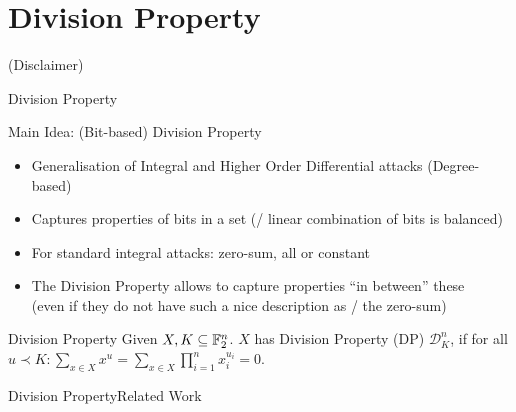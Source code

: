 \section{Division Property}
\begin{frame}[plain]
    \sectionpage
    \centering
    {\large
        (Disclaimer)
    }
    \vfill
\end{frame}

\begin{frame}{Division Property}
    \begin{block}{Main Idea: (Bit-based) Division Property}
        \begin{itemize}
            \item Generalisation of Integral and Higher Order Differential attacks \hfill (Degree-based)
            \item Captures properties of bits in a set \hfill (\eg/ linear combination of bits is balanced)
            \item For standard integral attacks: zero-sum, all or constant
            \item The Division Property allows to capture properties \enquote{in between} these\\
                  (even if they do not have such a nice description as \eg/ the zero-sum)
        \end{itemize}
    \end{block}
    \begin{block}{Division Property}
        Given $X, K \subseteq \mathbb{F}_2^n$.
        $X$ has Division Property (DP) $\mathcal{D}^n_K$, if for all
        $\displaystyle u \prec K: \sum_{x \in X} x^u = \sum_{x \in X} \prod_{i=1}^n x_i^{u_i} = 0$.
    \end{block}
\end{frame}

\begin{frame}{Division Property}{Related Work}
    \begin{timeline}
    \end{timeline}
\end{frame}

